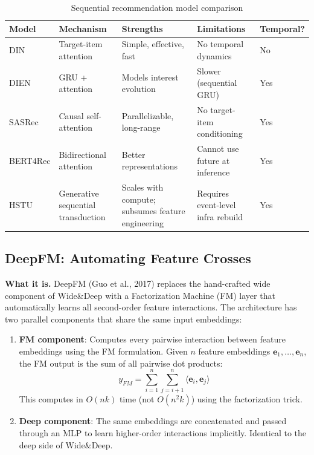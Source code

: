 \begin{table}[H]
\centering
\caption{Sequential recommendation model comparison}
\begin{tabularx}{\textwidth}{lXXXl}
\toprule
\textbf{Model} & \textbf{Mechanism} & \textbf{Strengths} & \textbf{Limitations} & \textbf{Temporal?} \\
\midrule
DIN & Target-item attention & Simple, effective, fast & No temporal dynamics & No \\
DIEN & GRU + attention & Models interest evolution & Slower (sequential GRU) & Yes \\
SASRec & Causal self-attention & Parallelizable, long-range & No target-item conditioning & Yes \\
BERT4Rec & Bidirectional attention & Better representations & Cannot use future at inference & Yes \\
HSTU & Generative sequential transduction & Scales with compute; subsumes feature engineering & Requires event-level infra rebuild & Yes \\
\bottomrule
\end{tabularx}
\end{table}

\subsection{DeepFM: Automating Feature Crosses}
\label{sr:sec:deepfm}

\textbf{What it is.} DeepFM (Guo et al., 2017) replaces the hand-crafted wide component of Wide\&Deep with a Factorization Machine (FM) layer that automatically learns all second-order feature interactions. The architecture has two parallel components that share the same input embeddings:

\begin{enumerate}
    \item \textbf{FM component}: Computes every pairwise interaction between feature embeddings using the FM formulation. Given $n$ feature embeddings $\mathbf{e}_1, \ldots, \mathbf{e}_n$, the FM output is the sum of all pairwise dot products:
    \begin{equation}
    y_{FM} = \sum_{i=1}^{n}\sum_{j=i+1}^{n} \langle \mathbf{e}_i, \mathbf{e}_j \rangle
    \end{equation}
    This computes in $O(nk)$ time (not $O(n^2 k)$) using the factorization trick.

    \item \textbf{Deep component}: The same embeddings are concatenated and passed through an MLP to learn higher-order interactions implicitly. Identical to the deep side of Wide\&Deep.
\end{enumerate}


